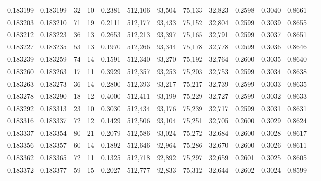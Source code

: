 \begin{tabular}{rrrrrrrrrrrrr}
0.183199 & 0.183199 &    32 &  10 &                                     0.2381 & 512,106 &  93,504 &  75,133 &  32,823 & 0.2598 & 0.3040 & 0.8661 \\
0.183203 & 0.183210 &    71 &  19 &                                     0.2111 & 512,177 &  93,433 &  75,152 &  32,804 & 0.2599 & 0.3039 & 0.8655 \\
0.183212 & 0.183223 &    36 &  13 &                                     0.2653 & 512,213 &  93,397 &  75,165 &  32,791 & 0.2599 & 0.3037 & 0.8651 \\
0.183227 & 0.183235 &    53 &  13 &                                     0.1970 & 512,266 &  93,344 &  75,178 &  32,778 & 0.2599 & 0.3036 & 0.8646 \\
0.183239 & 0.183259 &    74 &  14 &                                     0.1591 & 512,340 &  93,270 &  75,192 &  32,764 & 0.2600 & 0.3035 & 0.8640 \\
0.183260 & 0.183263 &    17 &  11 &                                     0.3929 & 512,357 &  93,253 &  75,203 &  32,753 & 0.2599 & 0.3034 & 0.8638 \\
0.183263 & 0.183273 &    36 &  14 &                                     0.2800 & 512,393 &  93,217 &  75,217 &  32,739 & 0.2599 & 0.3033 & 0.8635 \\
0.183278 & 0.183290 &    18 &  12 &                                     0.4000 & 512,411 &  93,199 &  75,229 &  32,727 & 0.2599 & 0.3032 & 0.8633 \\
0.183292 & 0.183313 &    23 &  10 &                                     0.3030 & 512,434 &  93,176 &  75,239 &  32,717 & 0.2599 & 0.3031 & 0.8631 \\
0.183316 & 0.183337 &    72 &  12 &                                     0.1429 & 512,506 &  93,104 &  75,251 &  32,705 & 0.2600 & 0.3029 & 0.8624 \\
0.183337 & 0.183354 &    80 &  21 &                                     0.2079 & 512,586 &  93,024 &  75,272 &  32,684 & 0.2600 & 0.3028 & 0.8617 \\
0.183356 & 0.183357 &    60 &  14 &                                     0.1892 & 512,646 &  92,964 &  75,286 &  32,670 & 0.2600 & 0.3026 & 0.8611 \\
0.183362 & 0.183365 &    72 &  11 &                                     0.1325 & 512,718 &  92,892 &  75,297 &  32,659 & 0.2601 & 0.3025 & 0.8605 \\
0.183372 & 0.183377 &    59 &  15 &                                     0.2027 & 512,777 &  92,833 &  75,312 &  32,644 & 0.2602 & 0.3024 & 0.8599 \\

\end{tabular}
